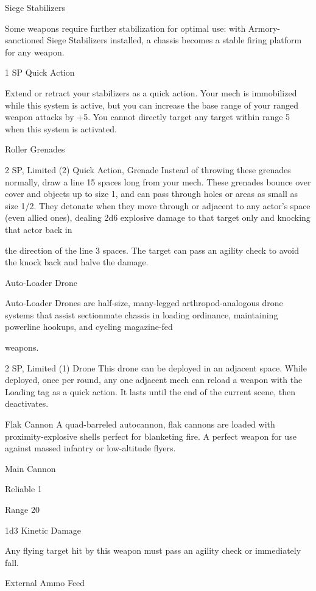Siege Stabilizers

Some weapons require further stabilization for optimal use: with Armory-sanctioned Siege Stabilizers
installed, a chassis becomes a stable firing platform for any weapon.

1 SP
Quick Action

Extend or retract your stabilizers as a quick action. Your mech is immobilized while this system is
active, but you can increase the base range of your ranged weapon attacks by +5. You cannot
directly target any target within range 5 when this system is activated.


Roller Grenades

2 SP, Limited (2)
Quick Action, Grenade
Instead of throwing these grenades normally, draw a line 15 spaces long from your mech. These
grenades bounce over cover and objects up to size 1, and can pass through holes or areas as
small as size 1/2. They detonate when they move through or adjacent to any actor’s space (even
allied ones), dealing 2d6 explosive damage to that target only and knocking that actor back in




the direction of the line 3 spaces. The target can pass an agility check to avoid the knock back
and halve the damage.


Auto-Loader Drone

Auto-Loader Drones are half-size, many-legged arthropod-analogous drone systems that assist
sectionmate chassis in loading ordinance, maintaining powerline hookups, and cycling magazine-fed

weapons.

2 SP, Limited (1)
Drone
This drone can be deployed in an adjacent space. While deployed, once per round, any one
adjacent mech can reload a weapon with the Loading tag as a quick action. It lasts until the end
of the current scene, then deactivates.


Flak Cannon
A quad-barreled autocannon, flak cannons are loaded with proximity-explosive shells perfect for
blanketing fire. A perfect weapon for use against massed infantry or low-altitude flyers.

Main Cannon

Reliable 1

Range 20

1d3 Kinetic Damage

Any flying target hit by this weapon must pass an agility check or immediately fall.

External Ammo Feed


